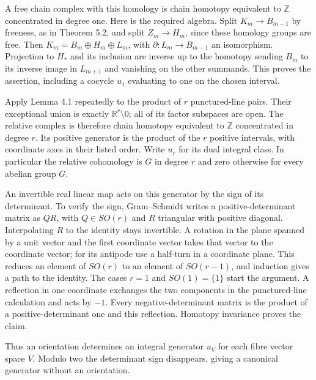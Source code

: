 A free chain complex with this homology is chain homotopy equivalent to \(\mathbb Z\) concentrated in degree one. Here is the required algebra. Split \(K_m\to B_{m-1}\) by freeness, as in Theorem 5.2, and split \(Z_m\to H_m\), since these homology groups are free. Then
\(K_m=B_m\oplus H_m\oplus L_m\),
with \(\partial:L_m\to B_{m-1}\) an isomorphism. Projection to \(H_*\) and its inclusion are inverse up to the homotopy sending \(B_m\) to its inverse image in \(L_{m+1}\) and vanishing on the other summands. This proves the assertion, including a cocycle \(u_1\) evaluating to one on the chosen interval.

Apply Lemma 4.1 repeatedly to the product of \(r\) punctured-line pairs. Their exceptional union is exactly \(\mathbb R^r\setminus0\); all of its factor subspaces are open. The relative complex is therefore chain homotopy equivalent to \(\mathbb Z\) concentrated in degree \(r\). Its positive generator is the product of the \(r\) positive intervals, with coordinate axes in their listed order. Write \(u_r\) for its dual integral class. In particular the relative cohomology is \(G\) in degree \(r\) and zero otherwise for every abelian group \(G\).

An invertible real linear map acts on this generator by the sign of its determinant. To verify the sign, Gram--Schmidt writes a positive-determinant matrix as \(QR\), with \(Q\in SO(r)\) and \(R\) triangular with positive diagonal. Interpolating \(R\) to the identity stays invertible. A rotation in the plane spanned by a unit vector and the first coordinate vector takes that vector to the coordinate vector; for its antipode use a half-turn in a coordinate plane. This reduces an element of \(SO(r)\) to an element of \(SO(r-1)\), and induction gives a path to the identity. The cases \(r=1\) and \(SO(1)=\{1\}\) start the argument. A reflection in one coordinate exchanges the two components in the punctured-line calculation and acts by \(-1\). Every negative-determinant matrix is the product of a positive-determinant one and this reflection. Homotopy invariance proves the claim.

Thus an orientation determines an integral generator \(u_V\) for each fibre vector space \(V\). Modulo two the determinant sign disappears, giving a canonical generator without an orientation.

\label{courseIII:thom-euler-for-lesson11:CG-S6-CHAIN-PROPOSITION-6.1}


